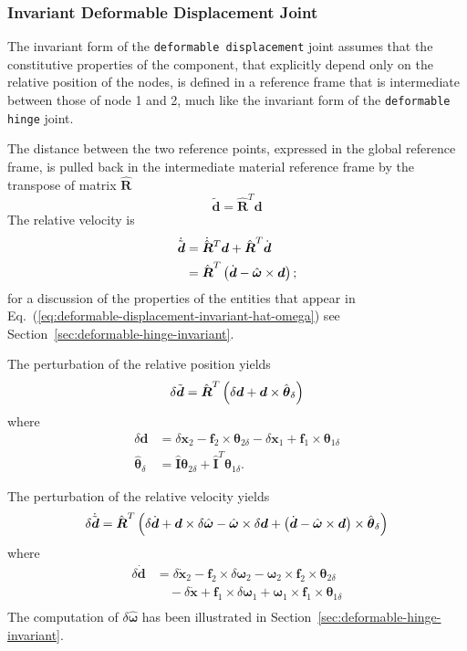 \documentclass[10pt,dvips,fleqn,subeqn]{report}
\newcommand{\T}[1]{\boldsymbol{#1}}
\newcommand{\TT}[1]{\boldsymbol{#1}}
\begin{document}
\subsubsection{Invariant Deformable Displacement Joint}
The invariant form of the \texttt{deformable displacement} joint
assumes that the constitutive properties of the component,
that explicitly depend only on the relative position 
of the nodes, is defined in a reference frame that is intermediate
between those of node 1 and 2, much like the invariant form
of the \texttt{deformable hinge} joint.

The distance between the two reference points, expressed
in the global reference frame, is pulled back in the 
intermediate material reference frame by the transpose
of matrix $\hat{\TT{R}}$
\begin{equation}
	\tilde{\T{d}} = \hat{\TT{R}}^T \T{d}
\end{equation}
The relative velocity is
\begin{align}
	\dot{\tilde{\T{d}}}
	&= \dot{\hat{\TT{R}}}^T \T{d} + \hat{\TT{R}}^T \dot{\T{d}}
		\nonumber \\
	&= \hat{\TT{R}}^T \plbr{
		\dot{\T{d}} - \hat{\T{\omega}} \times \T{d}
	} ;
\end{align}
for a discussion of the properties of the entities
that appear in Eq.~(\ref{eq:deformable-displacement-invariant-hat-omega})
see Section~\ref{sec:deformable-hinge-invariant}.

The perturbation of the relative position yields
\begin{equation}
	\delta\tilde{\T{d}} = \hat{\TT{R}}^T \plbr{
		\delta\T{d} + \T{d} \times \hat{\T{\theta}}_{\delta}
	}
\end{equation}
where
\begin{align}
	\delta\T{d}
	&= \delta\T{x}_2 - \T{f}_2 \times \T{\theta}_{2\delta}
		- \delta\T{x}_1 + \T{f}_1 \times \T{\theta}_{1\delta} \\
	\hat{\T{\theta}}_{\delta}
	&= \hat{\TT{I}} \T{\theta}_{2\delta} + \hat{\TT{I}}^T \T{\theta}_{1\delta} .
\end{align}

The perturbation of the relative velocity yields
\begin{equation}
	\delta\dot{\tilde{\T{d}}} = \hat{\TT{R}}^T \plbr{
		\delta\dot{\T{d}}
		+ \T{d} \times \delta\hat{\T{\omega}}
		- \hat{\T{\omega}} \times \delta\T{d}
		+ \plbr{\dot{\T{d}} - \hat{\T{\omega}} \times \T{d}} \times \hat{\T{\theta}}_{\delta}
	}
\end{equation}
where
\begin{align}
	\delta\dot{\T{d}}
	&= \delta\dot{\T{x}}_2
		- \T{f}_2 \times \delta\T{\omega}_{2}
		- \T{\omega}_{2} \times \T{f}_2 \times \T{\theta}_{2\delta}
			\nonumber \\
		& \quad - \delta\dot{\T{x}}
		+ \T{f}_1 \times \delta\T{\omega}_{1}
		+ \T{\omega}_{1} \times \T{f}_1 \times \T{\theta}_{1\delta} \\
\end{align}
The computation of $\delta\hat{\T{\omega}}$ has been illustrated
in Section~\ref{sec:deformable-hinge-invariant}.
\end{document}
